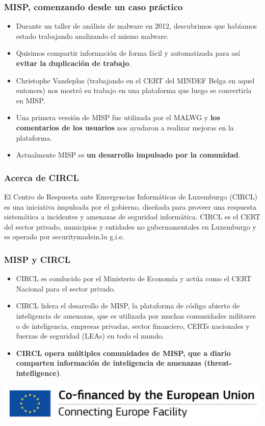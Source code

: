 
\begin{frame}[t,plain]
\titlepage
\end{frame}

\begin{frame}
 \frametitle{MISP, comenzando desde un caso práctico}
 \begin{itemize}
         \item Durante un taller de análisis de malware en 2012, descubrimos que habíamos estado trabajando analizando el mismo malware.
         \item Quisimos compartir información de forma fácil y automatizada para así {\bf evitar la duplicación de trabajo}.
         \item Christophe Vandeplas (trabajando en el CERT del MINDEF Belga en aquel entonces) nos mostró su trabajo en una plataforma que luego se convertiría en MISP.
         \item Una primera versión de MISP fue utilizada por el MALWG y {\bf los comentarios de los usuarios} nos ayudaron a realizar mejoras en la plataforma.
         \item Actualmente MISP es {\bf un desarrollo impulsado por la comunidad}.
 \end{itemize}
\end{frame}

\begin{frame}
\frametitle{Acerca de CIRCL}
El Centro de Respuesta ante Emergencias Informáticas de Luxemburgo (CIRCL) es una iniciativa impulsada por el gobierno, diseñada para proveer una respuesta sistemática a incidentes y amenazas de seguridad informática.
\linebreak
\linebreak
CIRCL es el CERT del sector privado, municipios y entidades no gubernamentales en Luxemburgo y es operado por securitymadein.lu g.i.e.
\end{frame}

\begin{frame}
\frametitle{MISP y CIRCL}
\begin{itemize}
\item CIRCL es conducido por el Ministerio de Economía y actúa como el CERT Nacional para el sector privado.
\item CIRCL lidera el desarrollo de MISP, la plataforma de código abierto de inteligencia de amenazas, que es utilizada por muchas comunidades militares o de inteligencia, empresas privadas, sector financiero, CERTs nacionales y fuerzas de seguridad (LEAs) en todo el mundo.
\item {\bf CIRCL opera múltiples comunidades de MISP, que a diario comparten información de inteligencia de amenazas (threat-intelligence)}.
\end{itemize}
        \includegraphics{en_cef.png}
\end{frame}

